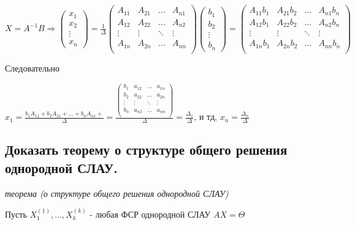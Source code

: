 $X = A^{-1}B \Rightarrow \begin{pmatrix}x_1\\x_2\\\vdots\\x_n\end{pmatrix} = \frac{1}{\Delta}
\begin{pmatrix}
    A_{11}&A_{21}&\ldots&A_{n1}\\
    A_{12}&A_{22}&\ldots&A_{n2}\\
    \vdots&\vdots&\ddots&\vdots\\
    A_{1n}&A_{2n}&\ldots&A_{nn}\\
\end{pmatrix}
\begin{pmatrix}b_1\\b_2\\\vdots\\b_n\end{pmatrix}
=
\begin{pmatrix}
    A_{11}b_1&A_{21}b_2&\ldots&A_{n1}b_n\\
    A_{12}b_1&A_{22}b_2&\ldots&A_{n2}b_n\\
    \vdots&\vdots&\ddots&\vdots\\
    A_{1n}b_1&A_{2n}b_2&\ldots&A_{nn}b_n\\
\end{pmatrix}
$

Следовательно

$
x_1 = \frac{b_1A_{11}+b_2A_{21}+...+b_nA_{n1}+}{\Delta}
=\frac{
\begin{pmatrix}
b_1&a_{12}&\ldots&a_{1n}\\
b_2&a_{22}&\ldots&a_{2n}\\
\vdots&\vdots&\ddots&\vdots\\
b_n&a_{n2}&\ldots&a_{nn}\\\end{pmatrix}}{\Delta}=
\frac{\Delta_1}{\Delta}
$, и тд, $x_n = \frac{\Delta_n}{\Delta}$

\ep 

\subsection{Доказать теорему о структуре общего решения однородной СЛАУ.}

\textit {теорема (о структуре общего решения однородной СЛАУ)}

\vspace*{15pt}

Пусть $X_1^{(1)}, ..., X_k^{(k)}$ - любая ФСР однородной СЛАУ $AX = \Theta$

